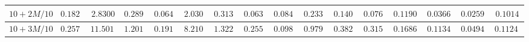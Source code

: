 \begin{landscape}
\begin{tabular}{|c|c|c|c|c|c|c|c|c|c|c|c|c|c|c|c}
$10 + 2M/10$ & $0.1825$                                                        & $2.8300$                                                        & $0.2894$                                                          & $0.0642$                                                           & $2.0303$                                                              & $0.3134$                                                        & $0.0636$                                                          & $0.0846$                                                           & $0.2333$                                                              & $0.1408$                                                        & $0.0764$                                                          & $0.11901$                                                        & $0.03666$                                                          & $0.02592$                                                           & \multicolumn{1}{c|}{$0.1014$}                                                              \\ \hline
$10 + 3M/10$ & $0.2578$                                                        & $11.5012$                                                       & $1.2011$                                                          & $0.1910$                                                           & $8.2102$                                                              & $1.3228$                                                        & $0.2554$                                                          & $0.0988$                                                           & $0.9799$                                                              & $0.3828$                                                        & $0.3152$                                                          & $0.16866$                                                        & $0.11348$                                                          & $0.04943$                                                           & \multicolumn{1}{c|}{$0.11242$}                                                              \\ \hline

\end{tabular}
\end{landscape}
